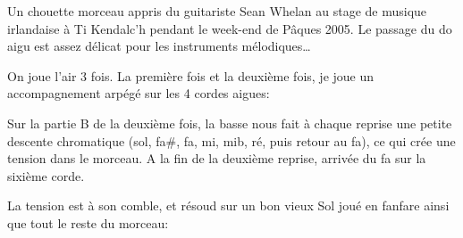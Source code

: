 Un chouette morceau appris du guitariste Sean Whelan au stage de musique
irlandaise à Ti Kendalc'h pendant le week-end de Pâques 2005. Le passage du do
aigu est assez délicat pour les instruments mélodiques\ldots

\tune

On joue l'air 3 fois. La première fois et la deuxième fois, je joue un
accompagnement arpégé sur les 4 cordes aigues:


Sur la partie B de la deuxième fois, la basse nous fait à chaque reprise une
petite descente chromatique (sol, fa\#, fa, mi, mib, ré, puis retour au fa),
ce qui crée une tension dans le morceau. A la fin de la deuxième reprise,
arrivée du fa sur la sixième corde.


La tension est à son comble, et résoud sur un bon vieux Sol joué en fanfare
ainsi que tout le reste du morceau:

\chords{
  \GMaj
  \DMaj
}